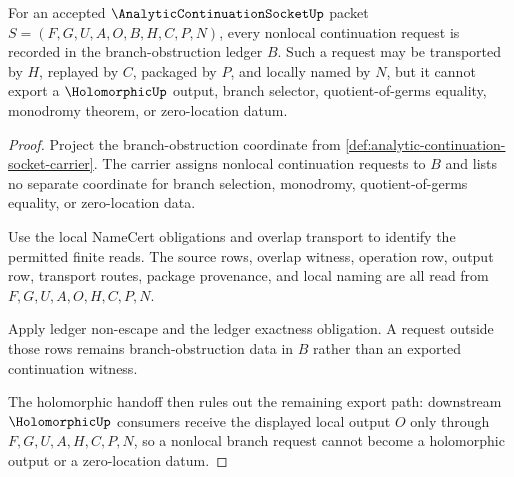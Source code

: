 \begin{theorem}
\label{thm:analytic-continuation-socket-branch-obstruction-nonexport}
For an accepted $\AnalyticContinuationSocketUp$ packet $S=(F,G,U,A,O,B,H,C,P,N)$, every nonlocal continuation request is recorded in the branch-obstruction ledger $B$. Such a request may be transported by $H$, replayed by $C$, packaged by $P$, and locally named by $N$, but it cannot export a $\HolomorphicUp$ output, branch selector, quotient-of-germs equality, monodromy theorem, or zero-location datum.
\end{theorem}
\begin{proof}
Project the branch-obstruction coordinate from \autoref{def:analytic-continuation-socket-carrier}. The carrier assigns nonlocal continuation requests to $B$ and lists no separate coordinate for branch selection, monodromy, quotient-of-germs equality, or zero-location data.

Use the local NameCert obligations and overlap transport to identify the permitted finite reads. The source rows, overlap witness, operation row, output row, transport routes, package provenance, and local naming are all read from $F,G,U,A,O,H,C,P,N$.

Apply ledger non-escape and the ledger exactness obligation. A request outside those rows remains branch-obstruction data in $B$ rather than an exported continuation witness.

The holomorphic handoff then rules out the remaining export path: downstream $\HolomorphicUp$ consumers receive the displayed local output $O$ only through $F,G,U,A,H,C,P,N$, so a nonlocal branch request cannot become a holomorphic output or a zero-location datum.
\end{proof}

